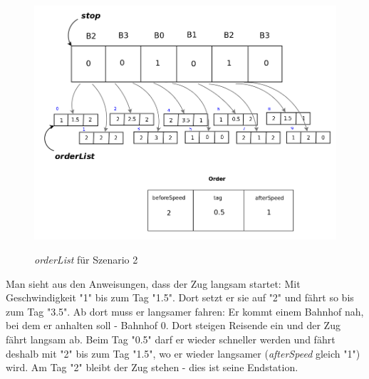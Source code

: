 \begin{figure}[H]	
\caption{\textit{orderList} für Szenario 2}
\includegraphics[width=2\textwidth, width=430pt]{content/images/orderList.png}
\label{pic:orderList2}
\end{figure}
\noindent
Man sieht aus den Anweisungen, dass der Zug langsam startet: Mit Geschwindigkeit "1" bis zum Tag "1.5". Dort setzt er sie auf "2" und fährt so bis zum Tag "3.5". Ab dort muss er langsamer fahren: Er kommt einem Bahnhof nah, bei dem er anhalten soll - Bahnhof 0. Dort steigen Reisende ein und der Zug fährt langsam ab. Beim Tag "0.5" darf er wieder schneller werden und fährt deshalb mit "2" bis zum Tag "1.5", wo er wieder langsamer (\textit{afterSpeed} gleich "1") wird. Am Tag "2" bleibt der Zug stehen - dies ist seine Endstation.\\
